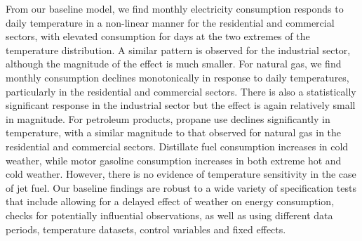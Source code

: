 \documentclass[11pt]{article}
\begin{document}
From our baseline model, we find monthly electricity consumption responds to daily temperature in a non-linear manner for the residential and commercial sectors, with elevated consumption for days at the two extremes of the temperature distribution. A similar pattern is observed for the industrial sector, although the magnitude of the effect is much smaller. For natural gas, we find monthly consumption declines monotonically in response to daily temperatures, particularly in the residential and commercial sectors. There is also a statistically significant response in the industrial sector but the effect is again relatively small in magnitude. For petroleum products, propane use declines significantly in temperature, with a similar magnitude to that observed for natural gas in the residential and commercial sectors. Distillate fuel consumption increases in cold weather, while motor gasoline consumption increases in both extreme hot and cold weather. However, there is no evidence of temperature sensitivity in the case of jet fuel. Our baseline findings are robust to a wide variety of specification tests that include allowing for a delayed effect of weather on energy consumption, checks for potentially influential observations, as well as using different data periods, temperature datasets, control variables and fixed effects. 
\end{document}
